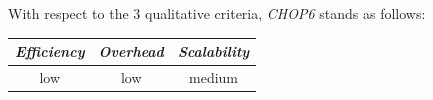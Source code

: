 %
%
With respect to the $3$ qualitative criteria, \emph{CHOP6} stands as follows:
\begin{center}
{\footnotesize
\begin{tabular}{ccc}
\emph{Efficiency} & \emph{Overhead} & \emph{Scalability} \\
\hline
low &
low &
medium
\end{tabular}
}
\end{center}



